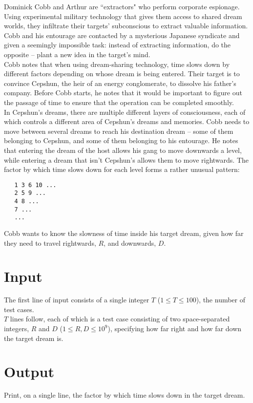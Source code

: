 
\noindent Dominick Cobb and Arthur are ``extractors" who perform corporate espionage. Using experimental military technology that gives them access to shared dream worlds, they infiltrate their targets' subconscious to extract valuable information. Cobb and his entourage are contacted by a mysterious Japanese syndicate and given a seemingly impossible task: instead of extracting information, do the opposite -- plant a new idea in the target's mind.\\

Cobb notes that when using dream-sharing technology, time slows down by different factors depending on whose dream is being entered. Their target is to convince Cepshun, the heir of an energy conglomerate, to dissolve his father's company. Before Cobb starts, he notes that it would be important to figure out the passage of time to ensure that the operation can be completed smoothly.\\

In Cepshun's dreams, there are multiple different layers of consciousness, each of which controls a different area of Cepshun's dreams and memories. Cobb needs to move between several dreams to reach his destination dream -- some of them belonging to Cepshun, and some of them belonging to his entourage. He notes that entering the dream of the host allows his gang to move downwards a level, while entering a dream that isn't Cepshun's allows them to move rightwards. The factor by which time slows down for each level forms a rather unusual pattern:

\begin{verbatim}
   1 3 6 10 ...
   2 5 9 ...
   4 8 ...
   7 ...
   ...
\end{verbatim}

\noindent Cobb wants to know the slowness of time inside his target dream, given how far they need to travel rightwards, $R$, and downwards, $D$.

\section*{Input}
The first line of input consists of a single integer $T$ ($1 \leq T \leq 100$), the number of test cases.\\
$T$ lines follow, each of which is a test case consisting of two space-separated integers, $R$ and $D$ ($1 \leq R, D \leq 10^{9}$), specifying how far right and how far down the target dream is.

\section*{Output}
Print, on a single line, the factor by which time slows down in the target dream.\\
